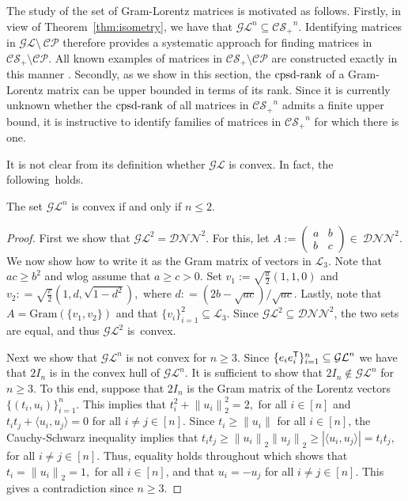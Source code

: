 \documentclass{siamart}
\begin{document}
{{The study of the set of Gram-Lorentz matrices is motivated as follows.  Firstly, in view of Theorem~\ref{thm:isometry}, we have  that
 $ {\mathcal{GL}}^n\subseteq {\mathcal{CS}_+}^n$. Identifying matrices in {${\mathcal{GL}}\setminus~{\mathcal{CP}}$} therefore provides a systematic approach for finding matrices
{in} ${\mathcal{CS}_+} \setminus {\mathcal{CP}}$. All known examples of matrices in ${\mathcal{CS}_+} \setminus {\mathcal{CP}}$ are  constructed exactly in this manner \cite{FW}.
Secondly,  as we show  in this {section}, the ${\mathrm{cpsd}\textnormal{-rank}}$ of a Gram-Lorentz matrix  can be upper bounded in terms of its rank. Since it {is} currently unknown whether the ${\mathrm{cpsd}\textnormal{-rank}}$ of all  matrices in ${\mathcal{CS}_+}^n$  admits a finite upper bound, it is instructive
to identify families of matrices in ${\mathcal{CS}_+}^n$ for which there is {one}.

It is not  clear from its definition whether ${\mathcal{GL}}$ is convex. In fact, the following~holds.

\medskip
\begin{lemma} The set
${\mathcal{GL}}^n$  is convex if and only if $n\le 2$.
\end{lemma}
\medskip 

\begin{proof}
First we show that ${\mathcal{GL}}^2={\mathcal{DNN}}^2$. For this, let   $A := \left( \begin{smallmatrix} a & b \\ b & c \end{smallmatrix} \right)\in~{\mathcal{DNN}}^2$. We now show how to write it as the Gram matrix of vectors in ${\mathcal{L}}_3$. Note that $ac\ge b^2$ and wlog  assume that  $a \geq c >0.$
Set
$ v_1:=  \sqrt{\frac{a}{2}}\left( 1,1, 0 \right)$ and $ v_2: =  \sqrt{\frac{c}{2}} \left(1, d , \sqrt{1-d^2} \right),$
where $d: = (2b - \sqrt{ac})/\sqrt{ac}$.
Lastly, note   that $A={\mathrm{Gram}}(\{ v_1, v_2 \})$ and that $\{v_i\}_{i=1}^2\subseteq {\mathcal{L}}_3$.
Since ${\mathcal{GL}}^2 \subseteq {\mathcal{DNN}}^2$, the two sets are equal, and thus ${\mathcal{GL}}^2$ is~convex.

Next we show that  ${\mathcal{GL}}^n$ is not convex for $n\geq 3$. Since $\{ e_ie_i^{{\sf T}} \}_{i=1}^n\subseteq   {\mathcal{GL}}^n$  we have that $2 I_n$ is in the convex hull of ${\mathcal{GL}}^n$.
It {is sufficient} to show  that $2 I_n \not\in {\mathcal{GL}}^n$ for $n \geq 3$. To
this end, suppose that $2 I_n$ is the Gram {matrix} of the Lorentz vectors
$\{(t_i, u_i)\}_{i=1}^n$. This implies that $t_i^2 + {\| {u_i} \|}_2^2 =
2,$ for all $i\in [n]$ and  $t_i t_j + {\langle {u_i}, {u_j} \rangle} = 0$ for all
$i\ne j\in [n]$. Since $t_i\ge \|u_i\|$ for all $i\in [n]$, the
Cauchy-Schwarz inequality  implies  that    $t_i t_j \geq {\| {u_i} \|}_2
{\| {u_j} \|}_2 \geq |{\langle {u_i}, {u_j} \rangle}| =t_i t_j,$  for all $i\ne j\in
[n]$. Thus,  equality holds throughout which shows  that  $t_i =
{\| {u_i} \|}_2 = 1,$ for all $i\in [n]$, and that $u_i=-u_j$ for all
$i\ne j\in [n]$. This gives a contradiction since $n \geq 3$.
\end{proof}

}}
\end{document}

